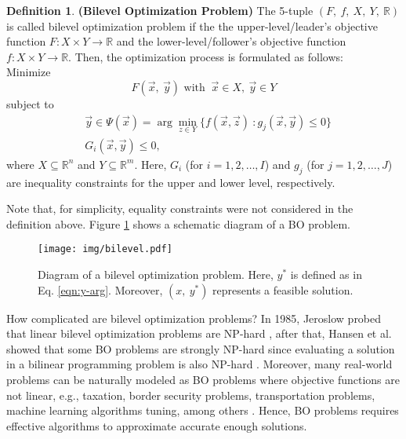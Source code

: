 \documentclass[conference]{IEEEtran}
\theoremstyle{definition}
\newtheorem{definition}{Definition}[section]
\begin{document}
\begin{definition}\textbf{(Bilevel Optimization Problem)}
    The 5-tuple $(F, \ f, \ X, \ Y, \ \mathbb{R} )$ is called bilevel optimization
    problem if the the upper-level/leader's objective function
    $F: X \times Y \to \mathbb{R}$ and the lower-level/follower's objective
    function $f: X \times Y \to \mathbb{R}$. Then, the optimization process is
    formulated as follows:\\
    \noindent
    Minimize
    \begin{equation}
        F(\vec{x},\ \vec{y}) \text{ with } \ \vec{x} \in X , \ \vec{y} \in Y 
        \label{eqn:minF1}
    \end{equation}
    subject to
    \begin{align}
        \label{eqn:y-arg}
        &\vec{y} \in \Psi(\vec{x}) = \arg \min_{z\in Y} \{ f(\vec{x}, \vec{z}) \ : g_j(\vec{x}, \vec{y})  \leq 0 \} \\
        &  G_{i}(\vec{x}, \vec{y}) \leq 0,
    \end{align}
    where $X \subseteq \mathbb{R}^n $
    and $Y \subseteq \mathbb{R}^m$.
    Here, $G_i$ (for $i = 1,2,\ldots,I$) and $g_j$ (for $j = 1,2,\ldots,J$) are
    inequality constraints for the upper and lower level, respectively.
\end{definition}
% 
Note that, for simplicity, equality constraints were not considered in the definition
above. Figure \ref{fig:bilevel} shows a schematic diagram of a BO problem.
% 
\begin{figure}[!ht]
    \centering
    \texttt{[image: img/bilevel.pdf]}
    \caption{Diagram of a bilevel optimization problem. Here, $y^*$ 
            is defined as in Eq. \ref{eqn:y-arg}. Moreover, $(x,\ y^*)$
            represents a feasible solution.}
    \label{fig:bilevel}
\end{figure}

How complicated are bilevel optimization problems?  In 1985, Jeroslow probed that
linear bilevel optimization problems are NP-hard \cite{jeroslow1985polynomial},
after that, Hansen et al. showed that some BO problems are strongly NP-hard since
evaluating a solution in a bilinear programming problem is also NP-hard
\cite{hansen1992new,vicente1994descent}. Moreover, many real-world problems can
be naturally modeled as BO problems \cite{sinha2018review} where objective functions
are not linear, e.g., taxation, border security problems, transportation problems,
machine learning algorithms tuning, among others \cite{bard2013practical,sinha2018review,arroyo2010bilevel}.
Hence, BO problems requires effective algorithms to approximate accurate enough
solutions.
\\
\end{document}
